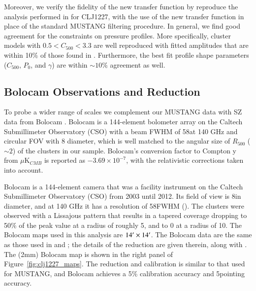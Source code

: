 \documentclass[twocolumn,traditabstract]{aa}
\begin{document}
Moreover, we verify the fidelity of the new transfer function by reproduce the analysis performed in \citet{romero2016} for CLJ1227,
with the use of the new transfer function in place of the standard MUSTANG filtering procedure.
In general, we find good agreement for the constraints on pressure profiles. More specifically, cluster models with
$0.5 < C_{500} < 3.3$ are well reproduced with fitted amplitudes that are within 10\% of those found in \citet{romero2016}.
Furthermore, the best fit profile shape parameters ($C_{500}$, $P_0$, and $\gamma$) are within $\sim10$\% agreement as well.


\subsection{Bolocam Observations and Reduction}
\label{sec:bolocamobs}

To probe a wider range of scales we complement our MUSTANG data with SZ data from Bolocam \citep{glenn1998}. 
Bolocam is a 144-element bolometer
array on the Caltech Submillimeter Observatory (CSO) with a beam FWHM of 58\asecs at 140 GHz and circular FOV with 8\amins 
diameter, which is well matched to the angular size of $R_{500}$ ($\sim 2$\amin) of the clusters in our sample. 
Bolocam's conversion factor to Compton y from $\mu$K$_{CMB}$ is reported as $-3.69 \times 10^{-7}$, with the relativistic
corrections taken into account.

Bolocam is a 144-element camera that was a facility instrument on the Caltech Submillimeter Observatory (CSO) from
2003 until 2012. Its field of view is 8\amins in diameter, and at 140 GHz it has a resolution of 58\asecs FWHM
(\citet{glenn1998,haig2004}). The clusters were observed with a Lissajous pattern that results in a tapered
coverage dropping to 50\% of the peak value at a radius of roughly 5\amin, and to 0 at a radius of 10\amin.
The Bolocam maps used in this analysis are $14\hbox{$^\prime$} \times 14\hbox{$^\prime$}$. The Bolocam data 
are the same as those used in \citet{czakon2015} and \citet{sayers2013}; the details of the reduction are 
given therein, along with \citet{sayers2011}. The (2mm) Bolocam map is shown in the right panel of Figure~\ref{fig:clj1227_maps}.
The reduction and calibration is similar to that used for MUSTANG, and Bolocam achieves a 
5\% calibration accuracy and 5\asecs pointing accuracy.
\end{document}
